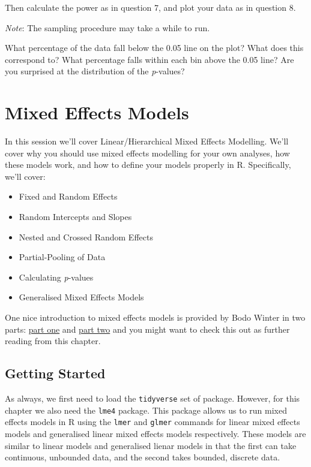 \documentclass[
]{book}
\providecommand{\tightlist}{%
  \setlength{\itemsep}{0pt}\setlength{\parskip}{0pt}}
\begin{document}
Then calculate the power as in question 7, and plot your data as in question 8.

\emph{Note}: The sampling procedure may take a while to run.

What percentage of the data fall below the 0.05 line on the plot? What does this correspond to? What percentage falls within each bin above the 0.05 line? Are you surprised at the distribution of the \emph{p}-values?

\hypertarget{mixed-effects-models}{%
\chapter{Mixed Effects Models}\label{mixed-effects-models}}

In this session we'll cover Linear/Hierarchical Mixed Effects Modelling. We'll cover why you should use mixed effects modelling for your own analyses, how these models work, and how to define your models properly in R. Specifically, we'll cover:

\begin{itemize}
\tightlist
\item
  Fixed and Random Effects
\item
  Random Intercepts and Slopes
\item
  Nested and Crossed Random Effects
\item
  Partial-Pooling of Data
\item
  Calculating \emph{p}-values
\item
  Generalised Mixed Effects Models
\end{itemize}

One nice introduction to mixed effects models is provided by Bodo Winter in two parts: \href{http://www.bodowinter.com/tutorial/bw_LME_tutorial1.pdf}{part one} and \href{http://www.bodowinter.com/tutorial/bw_LME_tutorial2.pdf}{part two} and you might want to check this out as further reading from this chapter.

\hypertarget{getting-started-6}{%
\section{Getting Started}\label{getting-started-6}}

As always, we first need to load the \texttt{tidyverse} set of package. However, for this chapter we also need the \texttt{lme4} package. This package allows us to run mixed effects models in R using the \texttt{lmer} and \texttt{glmer} commands for linear mixed effects models and generalised linear mixed effects models respectively. These models are similar to linear models and generalised lienar models in that the first can take continuous, unbounded data, and the second takes bounded, discrete data.
\end{document}
